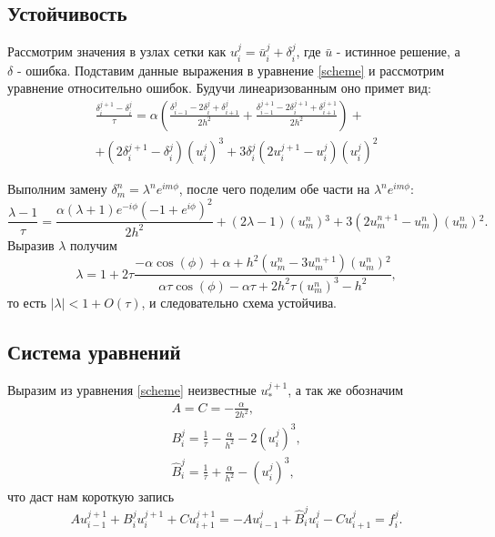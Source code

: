 \documentclass[a4paper,12pt]{article}
\begin{document}
\subsection*{Устойчивость}

Рассмотрим значения в узлах сетки как \(u_{i}^{j} = \bar{u}_{i}^{j} + \delta_{i}^{j}\), где \(\bar{u}\) - истинное решение, а \(\delta\) - ошибка. Подставим данные выражения в уравнение \cref{scheme} и рассмотрим уравнение относительно ошибок. Будучи линеаризованным оно примет вид:
\begin{multline*}
  \frac{\delta _{i}^{j+1}-\delta _{i}^{j}}{\tau }=\alpha  \left(\frac{\delta _{i-1}^{j}-2 \delta _{i}^{j}+\delta _{i+1}^{j}}{2 h^2}+\frac{\delta _{i-1}^{j+1}-2 \delta _{i}^{j+1}+\delta
    _{i+1}^{j+1}}{2 h^2}\right)+ \\
  + \left(2 \delta _{i}^{j+1}-\delta _{i}^{j}\right) \left(u_{i}^{j}\right)^3+3 \delta _{i}^{j} \left(2 u_{i}^{j+1}-u_{i}^{j}\right) \left(u_{i}^{j}\right)^2
\end{multline*}

Выполним замену \(\delta_{m}^{n}=\lambda^{n} e^{i m \phi}\), после чего поделим обе части на \(\lambda^{n} e^{i m \phi}\):
\begin{equation*}
  \frac{\lambda -1}{\tau }=\frac{\alpha  (\lambda +1) e^{-i \phi } \left(-1+e^{i \phi }\right)^2}{2 h^2}+(2 \lambda -1) \left(u_{m}^{n}\right){}^3+3 \left(2
  u_{m}^{n+1}-u_{m}^{n}\right) \left(u_{m}^{n}\right){}^2.
\end{equation*}
Выразив \(\lambda\) получим
\begin{equation*}
  \lambda = 1 + 2 \tau \frac{-\alpha  \cos (\phi )+\alpha +h^2 \left(u_{m}^{n}-3 u_{m}^{n+1}\right) \left(u_{m}^{n}\right){}^2}{\alpha  \tau  \cos (\phi )-\alpha  \tau +2 h^2 \tau
    \left(u_{m}^{n}\right)^3-h^2},
\end{equation*}
то есть \(\left|\lambda\right| < 1 + O(\tau)\), и следовательно схема устойчива.

\subsection*{Система уравнений}

Выразим из уравнения \cref{scheme} неизвестные \(u_{*}^{j+1}\), а так же обозначим
\begin{gather*}
  A = C = -\frac{\alpha}{2h^2},\\
  B_{i}^{j} = \frac{1}{\tau}-\frac{\alpha}{h^2} - 2 \left(u_{i}^{j}\right)^3,\\
  \hat{B}_{i}^{j} = \frac{1}{\tau}+\frac{\alpha}{h^2} - \left(u_{i}^{j}\right)^3,
\end{gather*}
что даст нам короткую запись
\begin{equation}\label{eq}
  A u_{i-1}^{j+1} + B_{i}^{j} u_{i}^{j+1} + C u_{i+1}^{j+1} = -A u_{i-1}^{j} + \hat{B}_{i}^{j} u_{i}^{j} - C u_{i+1}^{j}=f_{i}^{j}.
\end{equation}
\end{document}
